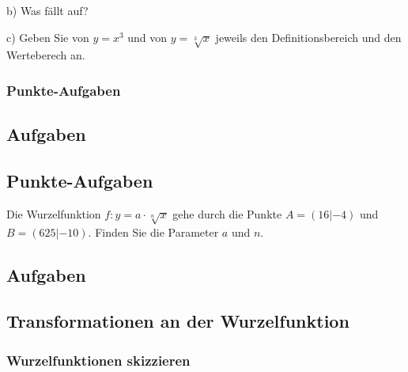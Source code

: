 
b) Was fällt auf?


c) Geben Sie von $y=x^3$ und von $y=\sqrt[3]{x}$ jeweils den
Definitionsbereich und den Werteberech an.


\newpage


\subsubsection{Punkte-Aufgaben}

\subsection*{Aufgaben}

\subsection{Punkte-Aufgaben}
Die Wurzelfunktion $f: y= a\cdot{} \sqrt[n]{x}$ gehe durch die Punkte
$A= (16 | -4)$ und $B=(625 | -10)$. Finden Sie die Parameter $a$ und
$n$.



\subsection*{Aufgaben}
\newpage


\subsection{Transformationen an der Wurzelfunktion}

\subsubsection{Wurzelfunktionen skizzieren}


